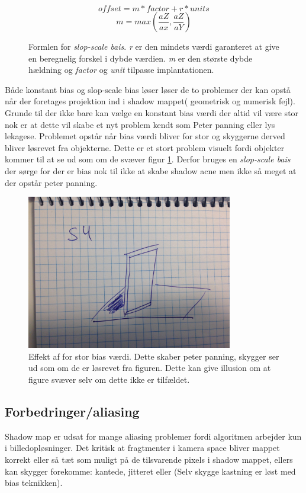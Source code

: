\documentclass[11pt,a4paper]{article}
\begin{document}
\begin{figure}
\[ offset = m * factor + r * units \] 
\[ m = max(\frac{aZ}{ax},\frac{aZ}{aY})\]
\caption{Formlen for \textit{slop-scale bais}. \textit{r} er den mindets værdi garanteret at give en beregnelig forskel i dybde værdien. \textit{m} er den største dybde hældning  og \textit{factor} og \textit{unit} tilpasse implantationen.}
\end{figure}


Både konstant bias og slop-scale bias løser løser de to problemer der kan opstå når der foretages projektion ind i shadow mappet( geometrisk og numerisk fejl). Grunde til der ikke bare kan vælge en konstant bias værdi der altid vil være stor nok er at dette vil skabe et nyt problem kendt som Peter panning eller lys lekagese. Problemet opstår når bias værdi bliver for stor og skyggerne derved bliver løsrevet fra objekterne. Dette er et stort problem visuelt fordi objekter kommer til at se ud som om de svæver figur \ref{S4}. Derfor bruges en \textit{slop-scale bais} der sørge for der er bias nok til ikke at skabe shadow acne men ikke så meget at der opstår peter panning.

\begin{figure}[ht!]
\centering
\includegraphics[width=90mm]{img/S4.jpg}
\caption{Effekt af for stor bias værdi. Dette skaber peter panning, skygger ser ud som om de er løsrevet fra figuren. Dette kan give illusion om at figure svæver selv om dette ikke er tilfældet.}
\label{S4}
\end{figure}


\newpage 

\subsection{Forbedringer/aliasing}

Shadow map  er udsat for mange aliasing problemer fordi algoritmen arbejder kun i billedopløsninger. Det kritisk at fragtmenter i kamera space bliver mappet korrekt eller så tæt som muligt på de tilsvarende pixels i shadow mappet, ellers kan skygger forekomme: kantede, jitteret eller (Selv skygge kastning er løst med bias teknikken). 
\end{document}
